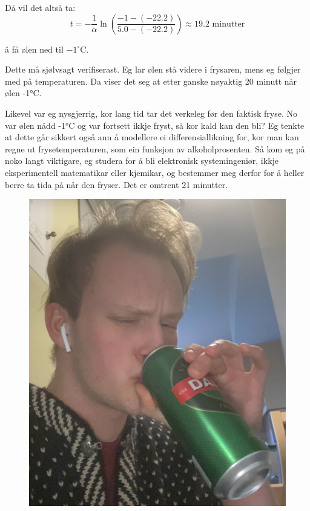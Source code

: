 \documentclass[a4paper,12pt]{article}
\begin{document}
Då vil det altså ta:
\[
t = -\frac{1}{\alpha} \ln\left(\frac{-1 - (-22.2)}{5.0 - (-22.2)}\right) \approx 19.2 \text{ minutter}
\]

å få ølen ned til $-1^\circ$C.


Dette må sjølvsagt verifiserast. Eg lar ølen stå videre i frysaren, mens eg følgjer med på temperaturen. Da viser det seg at etter ganske nøyaktig 20 minutt når ølen -1°C. 

Likevel var eg nysgjerrig, kor lang tid tar det verkeleg før den faktisk fryse. No var ølen nådd  -1°C og var fortsett ikkje fryst, så kor kald kan den bli? Eg tenkte at dette går sikkert også ann å modellere ei differensiallikning for, kor man kan regne ut frysetemperaturen, som ein funksjon av alkoholprosenten. Så kom eg på noko langt viktigare, eg studera for å bli elektronisk systemingeniør, ikkje eksperimentell matematikar eller kjemikar, og bestemmer meg derfor for å heller berre ta tida på når den fryser. Det er omtrent 21 minutter. 

\begin{figure}[h!]
    \centering
    \includegraphics[width=0.8\linewidth]{The fruit of my labour.png}
    \caption{}
    \label{ØL}
\end{figure}
\end{document}
